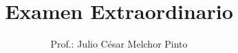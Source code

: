 \documentclass[12pt,addpoints]{evalua}
\title{Examen Extraordinario}
\author{Prof.: Julio César Melchor Pinto}
\begin{document}
\begin{questions}
    \question[10] 
    \newpage
    \question[10] 
    \question[20] 
    \newpage
    \question[10] 
    \newpage
    \question[20] 

    \question[15] 
    \begin{multicols}{2}
        \question[15] 
    \end{multicols}
\end{questions}
\end{document}
